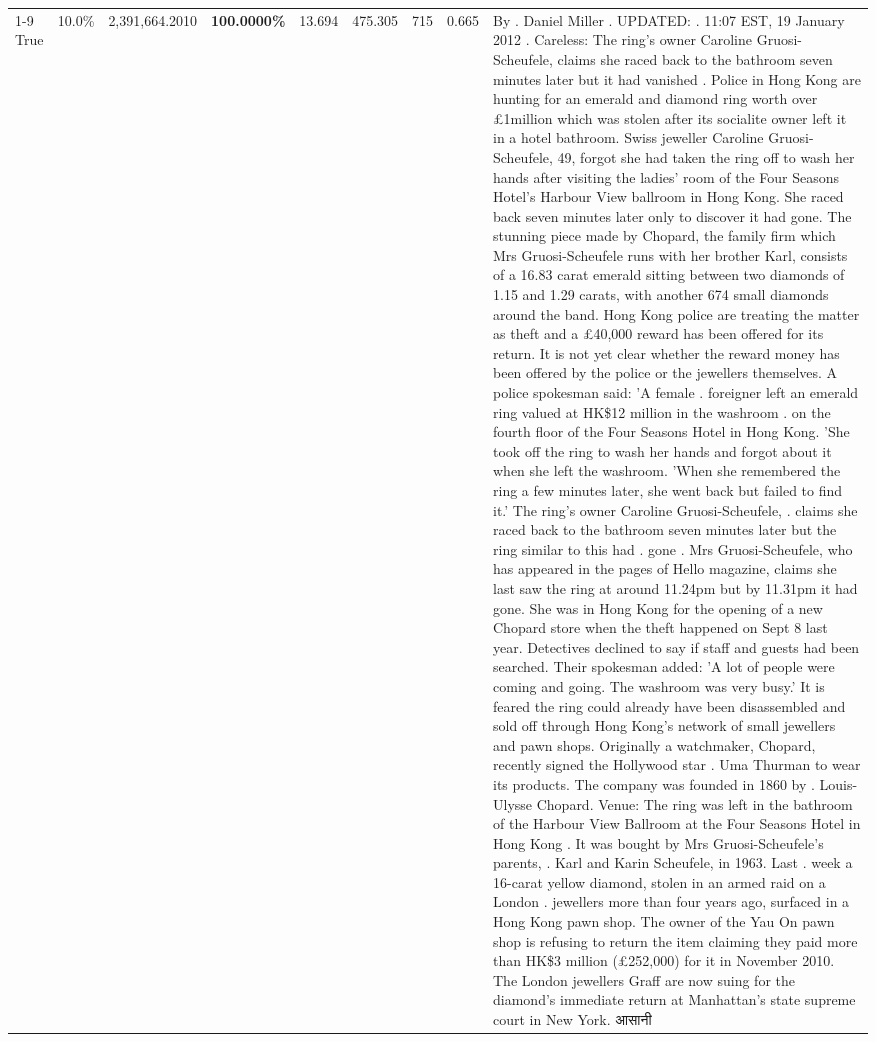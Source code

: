 \begin{table}[H]
\begin{tabular}{lllrlllll}
\cline{1-9}
True & 10.0\% & 2,391,664.2010 & \bfseries \color{red} 100.0000\% & 13.694 & 475.305 & 715 & 0.665 & By . Daniel Miller . UPDATED: . 11:07 EST, 19 January 2012 . Careless: The ring's owner Caroline Gruosi-Scheufele, claims she raced back to the bathroom seven minutes later but it had vanished . Police in Hong Kong are hunting for an emerald and diamond ring worth over £1million which was stolen after its socialite owner left it in a hotel bathroom. Swiss jeweller Caroline Gruosi-Scheufele, 49, forgot she had taken the ring off to wash her hands after visiting the ladies' room of the Four Seasons Hotel's Harbour View ballroom in Hong Kong. She raced back seven minutes later only to discover it had gone. The stunning piece made by Chopard, the family firm which Mrs Gruosi-Scheufele runs with her brother Karl, consists of a 16.83 carat emerald sitting between two diamonds of 1.15 and 1.29 carats, with another 674 small diamonds around the band. Hong Kong police are treating the matter as theft and a £40,000 reward has been offered for its return. It is not yet clear whether the reward money has been offered by the police or the jewellers themselves. A police spokesman said: 'A female . foreigner left an emerald ring valued at HK\$12 million in the washroom . on the fourth floor of the Four Seasons Hotel in Hong Kong. 'She took off the ring to wash her hands and forgot about it when she left the washroom. 'When she remembered the ring a few minutes later, she went back but failed to find it.' The ring's owner Caroline Gruosi-Scheufele, . claims she raced back to the bathroom seven minutes later but the ring similar to this had . gone . Mrs Gruosi-Scheufele, who has appeared in the pages of Hello magazine, claims she last saw the ring at around 11.24pm but by 11.31pm it had gone. She was in Hong Kong for the opening of a new Chopard store when the theft happened on Sept 8 last year. Detectives declined to say if staff and guests had been searched. Their spokesman added: 'A lot of people were coming and going. The washroom was very busy.' It is feared the ring could already have been disassembled and sold off through Hong Kong's network of small jewellers and pawn shops. Originally a watchmaker, Chopard, recently signed the Hollywood star . Uma Thurman to wear its products. The company was founded in 1860 by . Louis-Ulysse Chopard. Venue: The ring was left in the bathroom of the Harbour View Ballroom at the Four Seasons Hotel in Hong Kong . It was bought by Mrs Gruosi-Scheufele's  parents, . Karl and Karin Scheufele, in 1963. Last . week a 16-carat yellow diamond, stolen in an armed raid on a London . jewellers more than four years ago, surfaced in a Hong Kong pawn shop. The owner of the Yau On pawn shop is refusing to return the item claiming they paid more than HK\$3 million (£252,000) for it in November 2010. The London jewellers Graff are now suing for the diamond’s immediate return at Manhattan’s state supreme court in New York. आसानी \\

\end{tabular}
\end{table}
